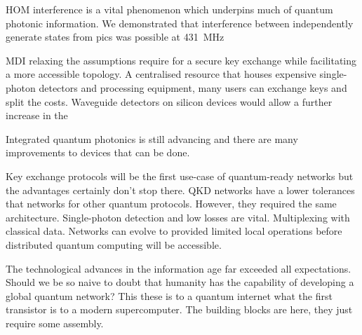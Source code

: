 \Ac{HOM} interference is a vital phenomenon which underpins much of quantum photonic information. We demonstrated that interference between independently generate states from \acp{pic} was possible at \SI{431}{MHz}

\Ac{MDI} relaxing the assumptions require for a secure key exchange while facilitating a more accessible topology. A centralised resource that houses expensive single-photon detectors and processing equipment, many users can exchange keys and split the costs. Waveguide detectors on silicon devices would allow a further increase in the 

Integrated quantum photonics is still advancing and there are many improvements to devices that can be done. 

Key exchange protocols will be the first use-case of quantum-ready networks but the advantages certainly don't stop there. \Ac{QKD} networks have a lower tolerances that networks for other quantum protocols. However, they required the same architecture. Single-photon detection and low losses are vital. Multiplexing with classical data. Networks can evolve to provided limited local operations before distributed quantum computing will be accessible. 

The technological advances in the information age far exceeded all expectations. Should we be so naive to doubt that humanity has the capability of developing a global quantum network? This these is to a quantum internet what the first transistor is to a modern supercomputer. The building blocks are here, they just require some assembly.

